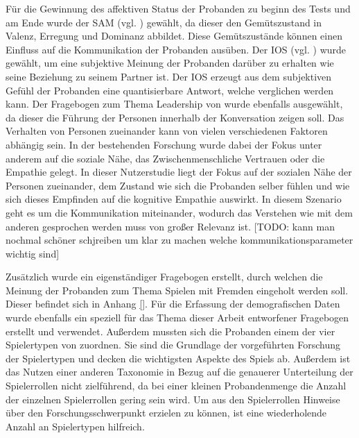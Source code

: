 Für die Gewinnung des affektiven Status der Probanden zu beginn des Tests und am Ende wurde der \ac{SAM} (vgl. \cite{russell_evidence_1977}) gewählt, da dieser den Gemütszustand in Valenz, Erregung und Dominanz abbildet. Diese Gemütszustände können einen Einfluss auf die Kommunikation der Probanden ausüben. Der \ac{IOS} (vgl. \cite{gachter_measuring_2015}) wurde gewählt, um eine subjektive Meinung der Probanden darüber zu erhalten wie seine Beziehung zu seinem Partner ist. Der \ac{IOS} erzeugt aus dem subjektiven Gefühl der Probanden eine quantisierbare Antwort, welche verglichen werden kann. Der Fragebogen zum Thema Leadership von \cite{emmerich_game_2016} wurde ebenfalls ausgewählt, da dieser die Führung der Personen innerhalb der Konversation zeigen soll. 
Das Verhalten von Personen zueinander kann von vielen verschiedenen Faktoren abhängig sein. In der bestehenden Forschung wurde dabei der Fokus unter anderem auf die soziale Nähe, das Zwischenmenschliche Vertrauen oder die Empathie gelegt. In dieser Nutzerstudie liegt der Fokus auf der sozialen Nähe der Personen zueinander, dem Zustand wie sich die Probanden selber fühlen und wie sich dieses Empfinden auf die kognitive Empathie auswirkt. In diesem Szenario geht es um die Kommunikation miteinander, wodurch das Verstehen wie mit dem anderen gesprochen werden muss von großer Relevanz ist. [TODO: kann man nochmal schöner schjreiben um klar zu machen welche kommunikationsparameter wichtig sind]

Zusätzlich wurde ein eigenständiger Fragebogen erstellt, durch welchen die Meinung der Probanden zum Thema Spielen mit Fremden eingeholt werden soll. Dieser befindet sich in Anhang \ref{}. Für die Erfassung der demografischen Daten wurde ebenfalls ein speziell für das Thema dieser Arbeit entworfener Fragebogen erstellt und verwendet. Außerdem mussten sich die Probanden einem der vier Spielertypen von \cite{bartle_hearts_1996} zuordnen. Sie sind die Grundlage der vorgeführten Forschung der Spielertypen und decken die wichtigsten Aspekte des Spiels ab. Außerdem ist das Nutzen einer anderen Taxonomie in Bezug auf die genauerer Unterteilung der Spielerrollen nicht zielführend, da bei einer kleinen Probandenmenge die Anzahl der einzelnen Spielerrollen gering sein wird. Um aus den Spielerrollen Hinweise über den Forschungsschwerpunkt erzielen zu können, ist eine wiederholende Anzahl an Spielertypen hilfreich.


